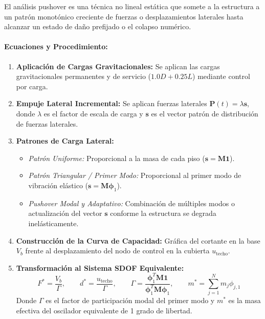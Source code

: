 \documentclass[11pt,letterpaper]{article}
\begin{document}
\begin{modulebox}
El análisis pushover es una técnica no lineal estática que somete a la estructura a un patrón monotónico creciente de fuerzas o desplazamientos laterales hasta alcanzar un estado de daño prefijado o el colapso numérico.

\paragraph{Ecuaciones y Procedimiento:}
\begin{enumerate}
    \item \textbf{Aplicación de Cargas Gravitacionales:} Se aplican las cargas gravitacionales permanentes y de servicio ($1.0D + 0.25L$) mediante control por carga.
    \item \textbf{Empuje Lateral Incremental:} Se aplican fuerzas laterales $\mathbf{P}(t) = \lambda \mathbf{s}$, donde $\lambda$ es el factor de escala de carga y $\mathbf{s}$ es el vector patrón de distribución de fuerzas laterales.
    \item \textbf{Patrones de Carga Lateral:}
    \begin{itemize}
        \item \textit{Patrón Uniforme:} Proporcional a la masa de cada piso ($\mathbf{s} = \mathbf{M}\mathbf{1}$).
        \item \textit{Patrón Triangular / Primer Modo:} Proporcional al primer modo de vibración elástico ($\mathbf{s} = \mathbf{M}\bm{\phi}_1$).
        \item \textit{Pushover Modal y Adaptativo:} Combinación de múltiples modos o actualización del vector $\mathbf{s}$ conforme la estructura se degrada inelásticamente.
    \end{itemize}
    \item \textbf{Construcción de la Curva de Capacidad:} Gráfica del cortante en la base $V_b$ frente al desplazamiento del nodo de control en la cubierta $u_{\text{techo}}$.
    \item \textbf{Transformación al Sistema SDOF Equivalente:}
    \begin{equation}
        F^* = \frac{V_b}{\Gamma}, \qquad d^* = \frac{u_{\text{techo}}}{\Gamma}, \qquad \Gamma = \frac{\bm{\phi}_1^T \mathbf{M} \mathbf{1}}{\bm{\phi}_1^T \mathbf{M} \bm{\phi}_1}, \qquad m^* = \sum_{j=1}^N m_j \phi_{j,1}
    \end{equation}
    Donde $\Gamma$ es el factor de participación modal del primer modo y $m^*$ es la masa efectiva del oscilador equivalente de 1 grado de libertad.
\end{enumerate}
\end{modulebox}
\end{document}
